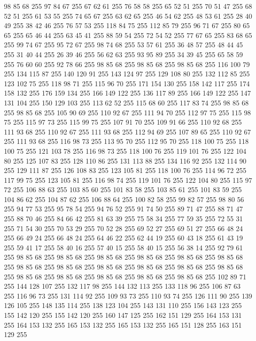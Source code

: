 98 85 68 255 97 84 67 255 67 62 61 255 76 58 58 255 65 52 51 255 70 51 47 255 68 52 51 255 61 53 55 255 74 65 67 255 63 62 65 255 46 54 62 255 48 53 61 255 28 40 49 255 38 42 46 255 76 57 53 255 118 84 75 255 112 85 79 255 96 71 67 255 80 65 65 255 65 46 44 255 63 45 41 255 88 59 54 255 72 54 52 255 77 67 65 255 83 68 65 255 99 74 67 255 95 72 67 255 98 74 68 255 53 57 61 255 36 48 57 255 48 44 45 255 31 40 44 255 26 39 46 255 56 62 63 255 93 95 89 255 34 39 45 255 65 58 59 255 76 60 60 255 92 78 66 255 98 85 68 255 98 85 68 255 98 85 68 255 116 100 79 255 134 115 87 255 140 120 91 255 143 124 97 255 129 108 80 255 132 112 85 255 123 102 75 255 118 98 71 255 115 96 70 255 171 154 130 255 158 142 117 255 174 158 132 255 176 159 134 255 166 149 122 255 136 117 89 255 166 149 122 255 147 131 104 255 150 129 103 255 113 62 52 255 115 68 60 255 117 83 74 255 98 85 68 255
98 85 68 255 105 90 69 255 110 92 67 255 111 94 70 255 112 97 75 255 115 98 75 255 115 97 73 255 115 99 75 255 107 91 70 255 109 91 66 255 110 92 68 255 111 93 68 255 110 92 67 255 111 93 68 255 112 94 69 255 107 89 65 255 110 92 67 255 111 93 68 255 116 98 73 255 113 95 70 255 112 95 70 255 118 100 75 255 118 100 75 255 121 103 78 255 116 98 73 255 118 100 76 255 119 101 76 255 122 104 80 255 125 107 83 255 128 110 86 255 131 113 88 255 134 116 92 255 132 114 90 255 129 111 87 255 126 108 83 255 123 105 81 255 118 100 76 255 114 96 72 255 117 99 75 255 123 105 81 255 116 98 74 255 119 101 76 255 122 104 80 255 115 97 72 255 106 88 63 255 103 85 60 255 101 83 58 255 103 85 61 255 101 83 59 255 104 86 62 255 104 87 62 255 106 88 64 255 100 82 58 255 99 82 57 255 98 80 56 255 94 77 53 255 95 78 54 255 94 76 52 255 91 74 50 255 89 71 47 255 88 71 47 255 88 70 46 255 84 66 42 255 81 63 39 255
75 58 34 255 77 59 35 255 72 55 31 255 71 54 30 255 70 53 29 255 70 52 28 255 69 52 27 255 69 51 27 255 66 48 24 255 66 49 24 255 66 48 24 255 64 46 22 255 62 44 19 255 60 43 18 255 61 43 19 255 59 41 17 255 58 40 16 255 57 40 15 255 58 40 15 255 56 38 14 255 92 79 61 255 98 85 68 255 98 85 68 255 98 85 68 255 98 85 68 255 98 85 68 255 98 85 68 255 98 85 68 255 98 85 68 255 98 85 68 255 98 85 68 255 98 85 68 255 98 85 68 255 98 85 68 255 98 85 68 255 98 85 68 255 98 85 68 255 98 85 68 255 102 89 71 255 144 128 107 255 132 117 98 255 144 132 113 255 133 118 96 255 106 87 63 255 116 96 73 255 131 114 92 255 109 93 73 255 110 93 74 255 126 111 90 255 139 126 105 255 148 135 114 255 138 123 104 255 143 131 110 255 156 143 123 255 155 142 120 255 155 142 120 255 160 147 125 255 162 151 129 255 164 153 131 255 164 153 132 255 165 153 132 255 165 153 132 255 165 151 128 255 163 151 129 255
